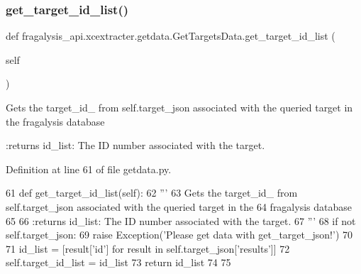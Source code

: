 \subsubsection{\texorpdfstring{get\+\_\+target\+\_\+id\+\_\+list()}{get\_target\_id\_list()}}
{\footnotesize\ttfamily def fragalysis\+\_\+api.\+xcextracter.\+getdata.\+Get\+Targets\+Data.\+get\+\_\+target\+\_\+id\+\_\+list (\begin{DoxyParamCaption}\item[{}]{self }\end{DoxyParamCaption})}

\begin{DoxyVerb}Gets the target_id_ from self.target_json associated with the queried target in the 
fragalysis database

:returns id_list: The ID number associated with the target.
\end{DoxyVerb}
 

Definition at line 61 of file getdata.\+py.


\begin{DoxyCode}
61     \textcolor{keyword}{def }get\_target\_id\_list(self):
62         \textcolor{stringliteral}{'''}
63 \textcolor{stringliteral}{        Gets the target\_id\_ from self.target\_json associated with the queried target in the }
64 \textcolor{stringliteral}{        fragalysis database}
65 \textcolor{stringliteral}{}
66 \textcolor{stringliteral}{        :returns id\_list: The ID number associated with the target.}
67 \textcolor{stringliteral}{        '''}
68         \textcolor{keywordflow}{if} \textcolor{keywordflow}{not} self.target\_json:
69             \textcolor{keywordflow}{raise} Exception(\textcolor{stringliteral}{'Please get data with get\_target\_json!'})
70 
71         id\_list = [result[\textcolor{stringliteral}{'id'}] \textcolor{keywordflow}{for} result \textcolor{keywordflow}{in} self.target\_json[\textcolor{stringliteral}{'results'}]]
72         self.target\_id\_list = id\_list
73         \textcolor{keywordflow}{return} id\_list
74 
75 
\end{DoxyCode}
\mbox{\label{classfragalysis__api_1_1xcextracter_1_1getdata_1_1_get_targets_data_ab67e7a9bfced7f671422ef8f4b6997c9}} 
